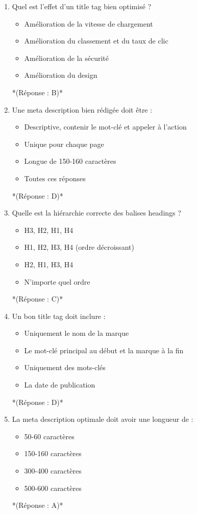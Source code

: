 \documentclass[12pt,a4paper,twoside]{report}
\begin{document}
\begin{enumerate}
\item Quel est l'effet d'un title tag bien optimisé ?
\begin{itemize}
\item[A)] Amélioration de la vitesse de chargement
\item[B)] Amélioration du classement et du taux de clic
\item[C)] Amélioration de la sécurité
\item[D)] Amélioration du design
\end{itemize}
*(Réponse : B)*

\item Une meta description bien rédigée doit être :
\begin{itemize}
\item[A)] Descriptive, contenir le mot-clé et appeler à l'action
\item[B)] Unique pour chaque page
\item[C)] Longue de 150-160 caractères
\item[D)] Toutes ces réponses
\end{itemize}
*(Réponse : D)*

\item Quelle est la hiérarchie correcte des balises headings ?
\begin{itemize}
\item[A)] H3, H2, H1, H4
\item[B)] H1, H2, H3, H4 (ordre décroissant)
\item[C)] H2, H1, H3, H4
\item[D)] N'importe quel ordre
\end{itemize}
*(Réponse : C)*

\item Un bon title tag doit inclure :
\begin{itemize}
\item[A)] Uniquement le nom de la marque
\item[B)] Le mot-clé principal au début et la marque à la fin
\item[C)] Uniquement des mots-clés
\item[D)] La date de publication
\end{itemize}
*(Réponse : D)*

\item La meta description optimale doit avoir une longueur de :
\begin{itemize}
\item[A)] 50-60 caractères
\item[B)] 150-160 caractères
\item[C)] 300-400 caractères
\item[D)] 500-600 caractères
\end{itemize}
*(Réponse : A)*


\end{enumerate}
\end{document}
